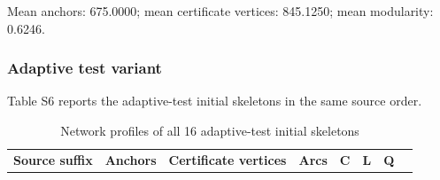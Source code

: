 \documentclass[pdflatex,sn-basic,Numbered]{sn-jnl}
\begin{document}
\endgroup

Mean anchors: 675.0000; mean certificate vertices: 845.1250; mean modularity: 0.6246.

\subsubsection*{Adaptive test variant}\label{adaptive-test-variant}

Table S6 reports the adaptive-test initial skeletons in the same source order.

\begingroup
\small
\setlength{\tabcolsep}{3pt}
\renewcommand{\arraystretch}{1.13}

\begin{longtable}[]{@{}
  >{\raggedright\arraybackslash}p{}
  >{\raggedleft\arraybackslash}p{}
  >{\raggedleft\arraybackslash}p{}
  >{\raggedleft\arraybackslash}p{}
  >{\raggedleft\arraybackslash}p{}
  >{\raggedleft\arraybackslash}p{}
  >{\raggedleft\arraybackslash}p{}
  >{\raggedleft\arraybackslash}p{}@{}}
\caption{Network profiles of all 16 adaptive-test initial skeletons}\label{tab:40}\tabularnewline
\toprule\noalign{}
\begin{minipage}[b]{\linewidth}\raggedright
\textbf{Source suffix}
\end{minipage} & \begin{minipage}[b]{\linewidth}\raggedleft
\textbf{Anchors}
\end{minipage} & \begin{minipage}[b]{\linewidth}\raggedleft
\textbf{Certificate vertices}
\end{minipage} & \begin{minipage}[b]{\linewidth}\raggedleft
\textbf{Arcs}
\end{minipage} & \begin{minipage}[b]{\linewidth}\raggedleft
\textbf{C}
\end{minipage} & \begin{minipage}[b]{\linewidth}\raggedleft
\textbf{L}
\end{minipage} & \begin{minipage}[b]{\linewidth}\raggedleft
\textbf{Q}

\end{minipage}
\end{longtable}
\end{document}
